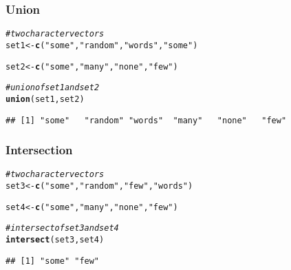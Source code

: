 \documentclass[12pt]{beamer}\usepackage[]{graphicx}\usepackage[]{color}
\makeatletter
\newcommand{\hlstr}[1]{\textcolor[rgb]{0.192,0.494,0.8}{#1}}%
\newcommand{\hlcom}[1]{\textcolor[rgb]{0.678,0.584,0.686}{\textit{#1}}}%
\newcommand{\hlstd}[1]{\textcolor[rgb]{0.345,0.345,0.345}{#1}}%
\newcommand{\hlkwb}[1]{\textcolor[rgb]{0.69,0.353,0.396}{#1}}%
\newcommand{\hlkwd}[1]{\textcolor[rgb]{0.737,0.353,0.396}{\textbf{#1}}}%
\newenvironment{kframe}{%
 \def\at@end@of@kframe{}%
 \ifinner\ifhmode%
  \def\at@end@of@kframe{\end{minipage}}%
  \begin{minipage}{\columnwidth}%
 \fi\fi%
 \def\FrameCommand##1{\hskip\@totalleftmargin \hskip-\fboxsep
 \colorbox{shadecolor}{##1}\hskip-\fboxsep
     \hskip-\linewidth \hskip-\@totalleftmargin \hskip\columnwidth}%
 \MakeFramed {\advance\hsize-\width
   \@totalleftmargin\z@ \linewidth\hsize
   \@setminipage}}%
 {\par\unskip\endMakeFramed%
 \at@end@of@kframe}
\newenvironment{knitrout}{}{} %
\makeatother
\begin{document}

\begin{frame}[fragile]
\frametitle{Union}

\begin{knitrout}\footnotesize
{}\color{fgcolor}\begin{kframe}
\begin{alltt}
\hlcom{# two character vectors}
\hlstd{set1} \hlkwb{<-} \hlkwd{c}\hlstd{(}\hlstr{"some"}\hlstd{,} \hlstr{"random"}\hlstd{,} \hlstr{"words"}\hlstd{,} \hlstr{"some"}\hlstd{)}

\hlstd{set2} \hlkwb{<-} \hlkwd{c}\hlstd{(}\hlstr{"some"}\hlstd{,} \hlstr{"many"}\hlstd{,} \hlstr{"none"}\hlstd{,} \hlstr{"few"}\hlstd{)}

\hlcom{# union of set1 and set2}
\hlkwd{union}\hlstd{(set1, set2)}
\end{alltt}
\begin{verbatim}
## [1] "some"   "random" "words"  "many"   "none"   "few"
\end{verbatim}
\end{kframe}
\end{knitrout}

\end{frame}


\begin{frame}[fragile]
\frametitle{Intersection}

\begin{knitrout}\footnotesize
{}\color{fgcolor}\begin{kframe}
\begin{alltt}
\hlcom{# two character vectors}
\hlstd{set3} \hlkwb{<-} \hlkwd{c}\hlstd{(}\hlstr{"some"}\hlstd{,} \hlstr{"random"}\hlstd{,} \hlstr{"few"}\hlstd{,} \hlstr{"words"}\hlstd{)}

\hlstd{set4} \hlkwb{<-} \hlkwd{c}\hlstd{(}\hlstr{"some"}\hlstd{,} \hlstr{"many"}\hlstd{,} \hlstr{"none"}\hlstd{,} \hlstr{"few"}\hlstd{)}

\hlcom{# intersect of set3 and set4}
\hlkwd{intersect}\hlstd{(set3, set4)}
\end{alltt}
\begin{verbatim}
## [1] "some" "few"
\end{verbatim}
\end{kframe}
\end{knitrout}

\end{frame}
\end{document}
